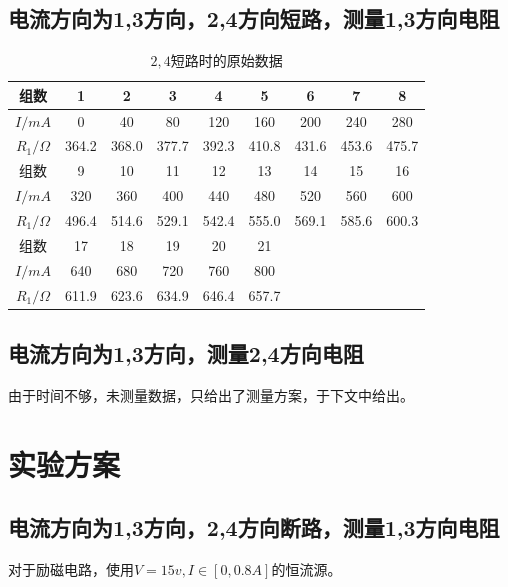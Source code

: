 \documentclass[a4paper,UTF8]{ctexart}
\begin{document}
\subsection{电流方向为1,3方向，2,4方向短路，测量1,3方向电阻}

\begin{table}[!ht]
    \centering
    \begin{tabular}{|c|c|c|c|c|c|c|c|c|}
    \hline
        组数 & 1 & 2 & 3 & 4 & 5 & 6 & 7 & 8 \\ \hline
        $I / mA$ & 0 & 40 & 80 & 120 & 160 & 200 & 240 & 280 \\ \hline
        $R_1 / \Omega$ & 364.2 & 368.0 & 377.7 & 392.3 & 410.8 & 431.6 & 453.6 & 475.7 \\ \hline
        组数 & 9 & 10 & 11 & 12 & 13 & 14 & 15 & 16 \\ \hline
        $I / mA$ & 320 & 360 & 400 & 440 & 480 & 520 & 560 & 600 \\ \hline
        $R_1 / \Omega$ & 496.4 & 514.6 & 529.1 & 542.4 & 555.0 & 569.1 & 585.6 & 600.3 \\ \hline
        组数 & 17 & 18 & 19 & 20 & 21 & ~ & ~ & ~ \\ \hline
        $I / mA$ & 640 & 680 & 720 & 760 & 800 & ~ & ~ & ~ \\ \hline
        $R_1 / \Omega$ & 611.9 & 623.6 & 634.9 & 646.4 & 657.7 & ~ & ~ & ~ \\ \hline
    \end{tabular}
    \caption{$2,4$短路时的原始数据}
\end{table}

\subsection{电流方向为1,3方向，测量2,4方向电阻}

由于时间不够，未测量数据，只给出了测量方案，于下文中给出。

\section{实验方案}

\subsection{电流方向为1,3方向，2,4方向断路，测量1,3方向电阻}

对于励磁电路，使用$V=15v,I \in \left[0,0.8A\right]$的恒流源。
\end{document}
